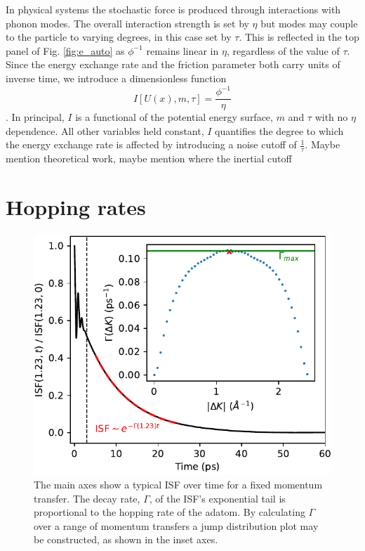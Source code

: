 \documentclass[7pt]{article}
\begin{document}
In physical systems the stochastic force is produced through interactions with phonon modes. The overall interaction strength is set by $\eta$ but modes may couple to the particle to varying degrees, in this case set by $\tau$. This is reflected in the top panel of Fig. \ref{fig:e_auto} as $\phi^{-1}$ remains linear in $\eta$, regardless of the value of $\tau$. Since the energy exchange rate and the friction parameter both carry units of inverse time, we introduce a dimensionless function $$I[U(x), m, \tau] = \frac{\phi^{-1}}{\eta}$$. In principal, $I$ is a functional of the potential energy surface, $m$ and $\tau$ with no $\eta$ dependence. All other variables held constant, $I$ quantifies the degree to which the energy exchange rate is affected by introducing a noise cutoff of $\frac{1}{\tau}$. Maybe mention theoretical work, maybe mention where the inertial cutoff

\section*{Hopping rates}

\begin{figure}
	\centering
	\includegraphics[width=1.0\columnwidth]{isf_dk}
	\caption{The main axes show a typical ISF over time for a fixed momentum transfer. The decay rate, $\Gamma$, of the ISF's exponential tail is proportional to the hopping rate of the adatom. By calculating $\Gamma$ over a range of momentum transfers a jump distribution plot may be constructed, as shown in the inset axes.} 
	\label{fig:isf_dk}
\end{figure}
\end{document}

